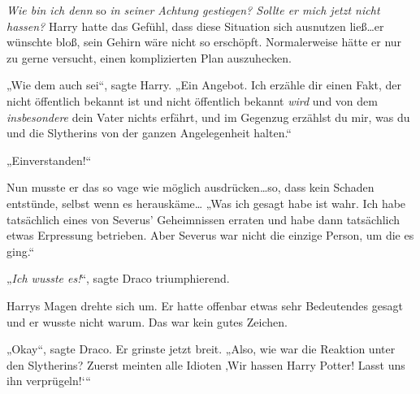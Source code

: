 \emph{Wie bin ich denn} so \emph{in seiner Achtung gestiegen? Sollte er mich jetzt nicht hassen?} Harry hatte das Gefühl, dass diese Situation sich ausnutzen ließ…er wünschte bloß, sein Gehirn wäre nicht so erschöpft. Normalerweise hätte er nur zu gerne versucht, einen komplizierten Plan auszuhecken.

„Wie dem auch sei“, sagte Harry. „Ein Angebot. Ich erzähle dir einen Fakt, der nicht öffentlich bekannt ist und nicht öffentlich bekannt \emph{wird} und von dem \emph{insbesondere} dein Vater nichts erfährt, und im Gegenzug erzählst du mir, was du und die Slytherins von der ganzen Angelegenheit halten.“

„Einverstanden!“

Nun musste er das so vage wie möglich ausdrücken…so, dass kein Schaden entstünde, selbst wenn es herauskäme… „Was ich gesagt habe ist wahr. Ich habe tatsächlich eines von Severus’ Geheimnissen erraten und habe dann tatsächlich etwas Erpressung betrieben. Aber Severus war nicht die einzige Person, um die es ging.“

„\emph{Ich wusste es!}“, sagte Draco triumphierend.

Harrys Magen drehte sich um. Er hatte offenbar etwas sehr Bedeutendes gesagt und er wusste nicht warum. Das war kein gutes Zeichen.

„Okay“, sagte Draco. Er grinste jetzt breit. „Also, wie war die Reaktion unter den Slytherins? Zuerst meinten alle Idioten ‚Wir hassen Harry Potter! Lasst uns ihn verprügeln!‘“

